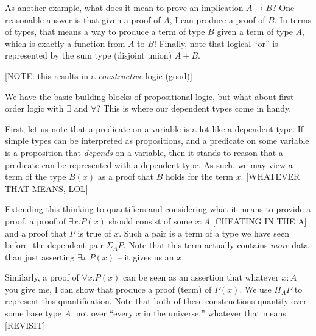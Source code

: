 \begin{table}[h!]
\centering
{}%
\hspace{.25\linewidth}
\end{table}

As another example, what does it mean to prove an implication $A \rightarrow B$?
One reasonable answer is that given a proof of $A$, I can produce a proof of
$B$. In terms of types, that means a way to produce a term of type $B$ given a
term of type $A$, which is exactly a function from $A$ to $B$! Finally, note
that logical ``or'' is represented by the sum type (disjoint union) $A + B$.

[NOTE: this results in a \emph{constructive} logic (good)]

We have the basic building blocks of propositional logic, but what about
first-order logic with $\exists$ and $\forall$? This is where our dependent
types come in handy.

First, let us note that a predicate on a variable is a lot like a dependent
type. If simple types can be interpreted as propositions, and a predicate on
some variable is a proposition that \emph{depends} on a variable, then it stands
to reason that a predicate can be represented with a dependent type. As such, we
may view a term of the type $B(x)$ as a proof that $B$ holds for the term $x$.
[WHATEVER THAT MEANS, LOL]

Extending this thinking to quantifiers and considering what it means to provide
a proof, a proof of $\exists x. P(x)$ should consist of some $x:A$ [CHEATING IN
THE A] and a proof that $P$ is true of $x$. Such a pair is a term of a type we have seen
before: the dependent pair $\Sigma_A P$. Note that this term actually contains
\emph{more} data than just asserting $\exists x. P(x)$ -- it gives us an $x$.

Similarly, a proof of $\forall x. P(x)$ can be seen as an assertion that
whatever $x:A$ you give me, I can show that produce a proof (term) of $P(x)$. We
use $\Pi_A P$ to represent this quantification. Note that both of these
constructions quantify over some base type $A$, not over ``every $x$ in
the universe,'' whatever that means. [REVISIT]
